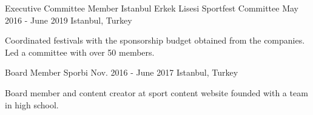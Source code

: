 
\begin{cventries}

  \cventry
    {Executive Committee Member}
    {Istanbul Erkek Lisesi Sportfest Committee}
    {May 2016 - June 2019}
    {Istanbul, Turkey}
    {
    \begin{cvitems}
        \item {Coordinated festivals with the sponsorship budget obtained from the companies. Led a committee with over 50 members.}
    \end{cvitems}
    }

  \cventry
    {Board Member}
    {Sporbi}
    {Nov. 2016 - June 2017}
    {Istanbul, Turkey}
    {
      \begin{cvitems}
        \item {Board member and content creator at sport content website founded with a team in high school.}
      \end{cvitems}
    }

\end{cventries}
